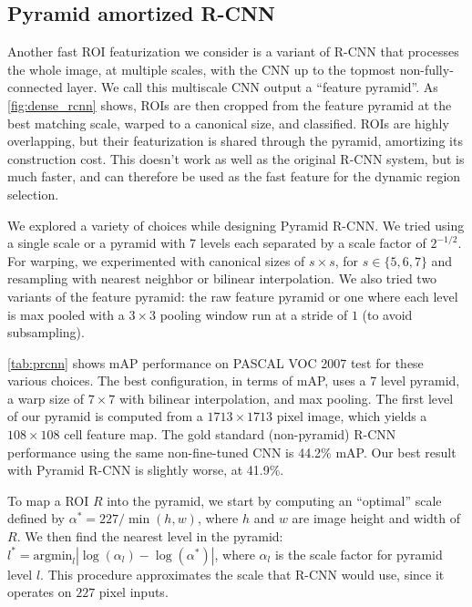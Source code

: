 \subsection{Pyramid amortized R-CNN}\label{sec:dense}

Another fast ROI featurization we consider is a variant of R-CNN that processes the whole image, at multiple scales, with the CNN up to the topmost non-fully-connected layer.
We call this multiscale CNN output a ``feature pyramid''.
As \autoref{fig:dense_rcnn} shows, ROIs are then cropped from the feature pyramid at the best matching scale, warped to a canonical size, and classified.
ROIs are highly overlapping, but their featurization is shared through the pyramid, amortizing its construction cost.
This doesn't work as well as the original R-CNN system, but is much faster, and can therefore be used as the fast feature for the dynamic region selection.


We explored a variety of choices while designing Pyramid R-CNN.
We tried using a single scale or a pyramid with 7 levels each separated by a scale factor of $2^{-1/2}$.
For warping, we experimented with canonical sizes of $s \times s$, for $s \in \{5,6,7\}$ and resampling with nearest neighbor or bilinear interpolation.
We also tried two variants of the feature pyramid: the raw feature pyramid or one where each level is max pooled with a $3 \times 3$ pooling window run at a stride of $1$ (to avoid subsampling).

\autoref{tab:prcnn} shows mAP performance on PASCAL VOC 2007 test for these various choices.
The best configuration, in terms of mAP, uses a 7 level pyramid, a warp size of $7 \times 7$ with bilinear interpolation, and max pooling.
The first level of our pyramid is computed from a $1713 \times 1713$ pixel image, which yields a $108 \times 108$ cell feature map.
The gold standard (non-pyramid) R-CNN performance using the same non-fine-tuned CNN is 44.2\% mAP.
Our best result with Pyramid R-CNN is slightly worse, at 41.9\%.

To map a ROI $R$ into the pyramid, we start by computing an ``optimal'' scale defined by $\alpha^* = 227/\min(h,w)$, where $h$ and $w$ are image height and width of $R$.
We then find the nearest level in the pyramid: $l^* = \textrm{argmin}_l |\log(\alpha_l) - \log(\alpha^*)|$, where $\alpha_l$ is the scale factor for pyramid level $l$.
This procedure approximates the scale that R-CNN would use, since it operates on $227$ pixel inputs.

